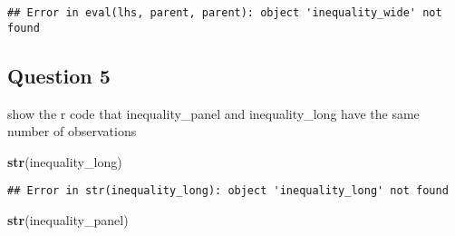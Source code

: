 \documentclass[
]{article}
\newenvironment{Shaded}{\begin{snugshade}}{\end{snugshade}}
\newcommand{\CommentTok}[1]{\textcolor[rgb]{0.56,0.35,0.01}{\textit{#1}}}
\newcommand{\DataTypeTok}[1]{\textcolor[rgb]{0.13,0.29,0.53}{#1}}
\newcommand{\DecValTok}[1]{\textcolor[rgb]{0.00,0.00,0.81}{#1}}
\newcommand{\KeywordTok}[1]{\textcolor[rgb]{0.13,0.29,0.53}{\textbf{#1}}}
\newcommand{\NormalTok}[1]{#1}
\newcommand{\OperatorTok}[1]{\textcolor[rgb]{0.81,0.36,0.00}{\textbf{#1}}}
\newcommand{\OtherTok}[1]{\textcolor[rgb]{0.56,0.35,0.01}{#1}}
\newcommand{\StringTok}[1]{\textcolor[rgb]{0.31,0.60,0.02}{#1}}
\begin{document}
\begin{Shaded}
\end{Shaded}

\begin{verbatim}
## Error in eval(lhs, parent, parent): object 'inequality_wide' not found
\end{verbatim}

\hypertarget{question-5}{%
\subsection{Question 5}\label{question-5}}

show the r code that inequality\_panel and inequality\_long have the
same number of observations

\begin{Shaded}
\begin{Highlighting}[]
\KeywordTok{str}\NormalTok{(inequality_long)}
\end{Highlighting}
\end{Shaded}

\begin{verbatim}
## Error in str(inequality_long): object 'inequality_long' not found
\end{verbatim}

\begin{Shaded}
\begin{Highlighting}[]
\KeywordTok{str}\NormalTok{(inequality_panel)}
\end{Highlighting}
\end{Shaded}
\end{document}
